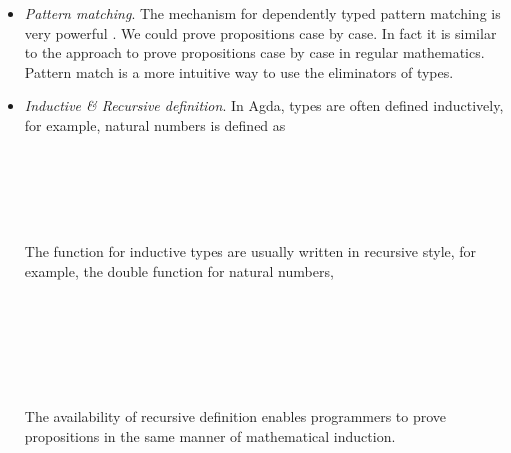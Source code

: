 \begin{itemize}

\item \textit{Pattern matching}. The mechanism for dependently typed pattern matching is very powerful \cite{alti:pisigma-new}. We could prove propositions case by case. In fact it is similar to the approach to prove propositions case by case in regular mathematics. Pattern match is a more intuitive way to use the eliminators of types.

\item \textit{Inductive \& Recursive definition}. In Agda, types are often defined inductively, for example, natural numbers is defined as

\begin{code}\>\<%
\\
\>  \AgdaSymbol{:}  \<%
\\
\>[0]\<[2]%
\>[2] \AgdaSymbol{:} \<%
\\
\>[0]\<[2]%
\>[2] \<[7]%
\>[7]\AgdaSymbol{:} \AgdaSymbol{(} \AgdaSymbol{:} \AgdaSymbol{)}  \<%
\\
\>\<\end{code}

The function for inductive types are usually written in recursive style, for example, the double function for natural numbers,

\begin{code}\>\<%
\\
\> \AgdaSymbol{:}   \<%
\\
\>  \AgdaSymbol{=} \<%
\\
\> \AgdaSymbol{(} \AgdaSymbol{)} \AgdaSymbol{=}  \AgdaSymbol{(} \AgdaSymbol{(} \AgdaSymbol{))}\<%
\\
%
\\
\>\<\end{code}

The availability of recursive definition enables programmers to prove propositions in the same manner of mathematical induction. 


\end{itemize}
